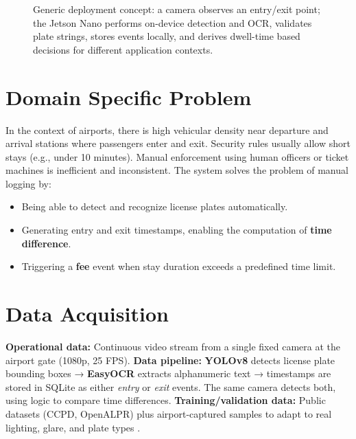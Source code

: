\begin{figure}[h!]
	\centering
	
	\caption{Generic deployment concept: a camera observes an entry/exit point; the Jetson Nano performs on-device detection and \ac{OCR}, validates plate strings, stores events locally, and derives dwell-time based decisions for different application contexts.}
	\label{fig:airport-anpr-advanced}
\end{figure}

\section{Domain Specific Problem}
In the context of airports, there is high vehicular density near departure and arrival stations where passengers enter and exit.  
Security rules usually allow short stays (e.g., under 10 minutes). Manual enforcement using human officers or ticket machines is inefficient and inconsistent.  
The system solves the problem of manual logging by:
\begin{itemize}
	\item Being able to detect and recognize license plates automatically. 
	\item Generating entry and exit timestamps, enabling  the computation of \textbf{time difference}. 
	\item Triggering a \textbf{fee} event when stay duration exceeds a predefined time limit.
\end{itemize}

\section{Data Acquisition}
\textbf{Operational data:} Continuous video stream from a single fixed camera at the airport gate (1080p, 25 FPS).  
\textbf{Data pipeline:} \textbf{YOLOv8} detects license plate bounding boxes → \textbf{EasyOCR} extracts alphanumeric text → timestamps are stored in SQLite as either \emph{entry} or \emph{exit} events.  
The same camera detects both, using logic to compare time differences.  
\textbf{Training/validation data:} Public datasets (CCPD, OpenALPR) plus airport-captured samples to adapt to real lighting, glare, and plate types \cite{ccpd-2018, openalpr-benchmark, eu-anpr}.

